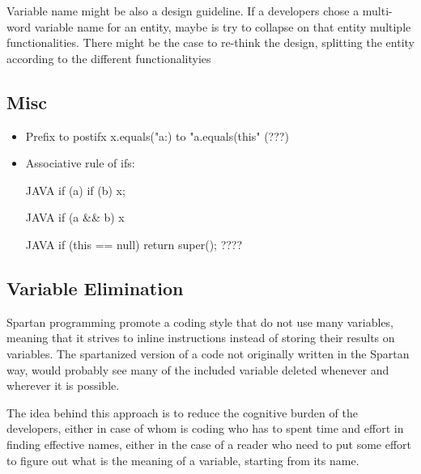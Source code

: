 Variable name might be also a design guideline. If a developers chose a multi-word variable name for an 
entity, maybe is try to collapse on that entity multiple functionalities. 
There might be the case to re-think the design, splitting the entity according to the different functionalityies 



\subsection{Misc}
\begin{itemize}
\item Prefix to postifx
x.equals("a:) to "a.equals(this" (???)


\item Associative rule of ifs: 
  \begin{code}{JAVA}
if (a) if (b) x;
\end{code}
  \begin{code}{JAVA}
if (a && b) x
  \end{code}
\begin{code}{JAVA}
if (this == null) return super();
????\end{code}
  
  \end{itemize}

\subsection{Variable Elimination}

Spartan programming promote a coding style that do not use many variables, meaning that it strives to inline instructions instead of 
storing their results on variables. The spartanized version of a code not originally written in the Spartan way, would 
probably see many of the included variable deleted whenever and wherever it is possible.

The idea behind this approach is to reduce the cognitive burden of the developers, either in case of whom is coding who has to spent
time and effort in finding effective names, either in the case of a reader who need to put some effort to figure out what is the meaning of 
a variable, starting from its name. 

